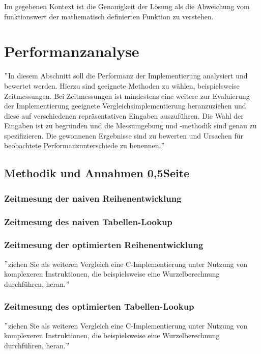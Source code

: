 \documentclass[course=erap]{aspdoc}
\begin{document}
Im gegebenen Kontext ist die Genauigkeit der Lösung als die Abweichung vom funktionswert der mathematisch definierten Funktion zu verstehen.

\section{Performanzanalyse}
\("\)In diesem Abschnitt soll die Performanz der Implementierung analysiert und bewertet werden.
Hierzu sind geeignete Methoden zu wählen, beispielsweise Zeitmessungen.
Bei Zeitmessungen ist mindestens eine weitere zur Evaluierung der Implementierung geeignete Vergleichsimplementierung
heranzuziehen und diese auf verschiedenen repräsentativen Eingaben auszuführen.
Die Wahl der Eingaben ist zu begründen und die Messumgebung und -methodik sind genau zu spezifizieren.
Die gewonnenen Ergebnisse sind zu bewerten und Ursachen für beobachtete Performanzunterschiede zu benennen.\("\)

\subsection{Methodik und Annahmen 0,5Seite}

\subsubsection{Zeitmesung der naiven Reihenentwicklung}

\subsubsection{Zeitmesung des naiven Tabellen-Lookup}

\subsubsection{Zeitmesung der optimierten Reihenentwicklung}
\("\)ziehen Sie als weiteren Vergleich eine C-Implementierung unter Nutzung von komplexeren Instruktionen, die beispielsweise eine Wurzelberechnung durchführen, heran.\("\)

\subsubsection{Zeitmesung des optimierten Tabellen-Lookup}
\("\)ziehen Sie als weiteren Vergleich eine C-Implementierung unter Nutzung von komplexeren Instruktionen, die beispielsweise eine Wurzelberechnung durchführen, heran.\("\)
\end{document}
